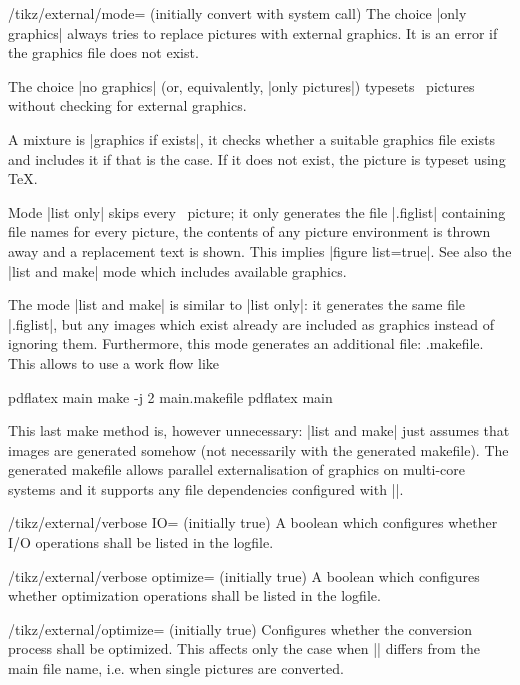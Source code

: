 {\begin{key}{/tikz/external/mode= (initially convert with system call)}
	The choice |only graphics| always tries to replace pictures with external graphics. It is an error if the graphics file does not exist.

	The choice |no graphics| (or, equivalently, |only pictures|) typesets \tikzname\ pictures without checking for external graphics.

	A mixture is |graphics if exists|, it checks whether a suitable graphics file exists and includes it if that is the case. If it does not exist, the picture is typeset using \TeX.

	Mode |list only| skips every \tikzname\ picture; it only generates the file |.figlist| containing file names for every picture, the contents of any picture environment is thrown away and a replacement text is shown. This implies |figure list=true|. See also the |list and make| mode which includes available graphics.

	The mode |list and make| is similar to |list only|: it generates the same file |.figlist|, but any images which exist already are included as graphics instead of ignoring them. Furthermore, this mode generates an additional file: .makefile. This allows to use a work flow like
\begin{codeexample}
pdflatex main
make -j 2 main.makefile
pdflatex main
\end{codeexample}
	\noindent This last make method is, however unnecessary: |list and make| just assumes that images are generated somehow (not necessarily with the generated makefile). The generated makefile allows parallel externalisation of graphics on multi-core systems and it supports any file dependencies configured with |\tikzpicturedependsonfile|.


\end{key}


\begin{key}{/tikz/external/verbose IO= (initially true)}
	A boolean which configures whether I/O operations shall be listed in the logfile.
\end{key}
\begin{key}{/tikz/external/verbose optimize= (initially true)}
	A boolean which configures whether optimization operations shall be listed in the logfile.
\end{key}

\begin{key}{/tikz/external/optimize= (initially true)}
	Configures whether the conversion process shall be optimized. This affects only the case when |\jobname| differs from the main file name, i.e. when single pictures are converted.


\end{key}}
